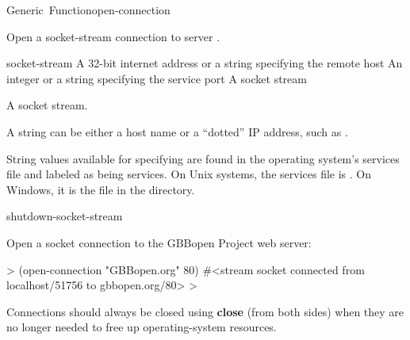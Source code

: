 \documentclass[10pt,twoside,english,pdftex]{article}
\begin{document}
\begin{functiondoc}{Generic~Function}{open-connection}{
  \returns{} }
%
%
%

\fnsyntax

\fnpurpose Open a socket-stream connection to server .

\fnmethods
{}

\fnpackage {}

\fnmodule {}

\fnargs
\begin{args}{socket-stream}
\arg[host] A 32-bit internet address or a string specifying the remote host
\arg[port] An integer or a string specifying the service port
 A socket stream
\end{args}

\fnreturns A socket stream.

\fndescription A  string can be either a host name or a
``dotted'' IP address, such as .

String values available for specifying 
are found in the operating system's services file and labeled as being
 services. On Unix systems, the services file is
. On Windows, it is the file  in
the  directory.

\begin{alsos}{shutdown-socket-stream}
\end{alsos}

\fnexample
Open a socket connection to the GBBopen Project web server:
%
\W\supp
\begin{example}
  > (open-connection "GBBopen.org" 80)
  #<stream socket connected from localhost/51756 to gbbopen.org/80>
  >
\end{example}

\fnnote Connections should always be closed using \textbf{close} (from
both sides) when they are no longer needed to free up operating-system
resources.

\end{functiondoc}
\end{document}
